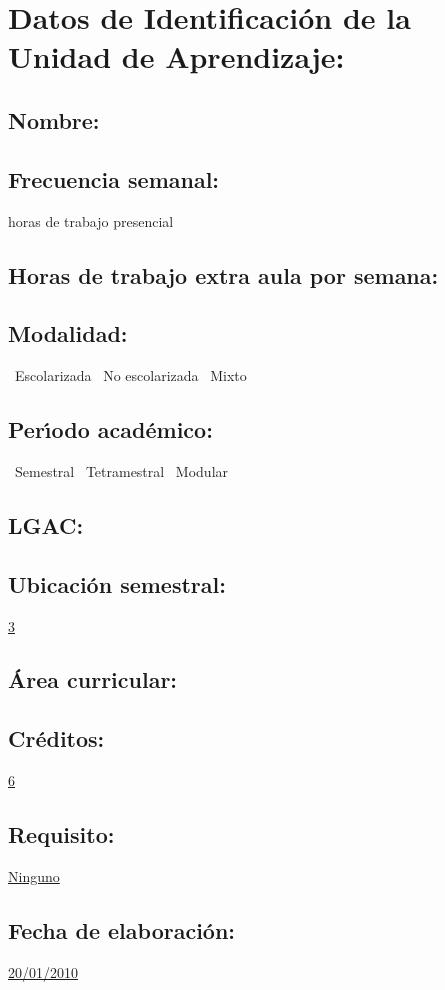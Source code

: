 \documentclass[10 pt]{article}
\begin{document}


\section{Datos de Identificaci\'{o}n de la Unidad de Aprendizaje:}
\subsection{Nombre:} 
\subsection{Frecuencia semanal:} horas de trabajo presencial 
\subsection{Horas de trabajo extra aula por semana:} 
\subsection{Modalidad:} \yes~Escolarizada \no~No escolarizada \no~Mixto
\subsection{Per\'{\i}odo acad\'{e}mico:} \yes~Semestral
\no~Tetramestral \no~Modular
\subsection{LGAC:} \underline{\odsi}
\subsection{Ubicaci\'{o}n semestral:} \underline{3}
\subsection{\'{A}rea curricular:} \underline{\pi}
\subsection{Cr\'{e}ditos:} \underline{6}
\subsection{Requisito:} \underline{Ninguno}
\subsection{Fecha de elaboraci\'{o}n:} \underline{20/01/2010}
\end{document}
